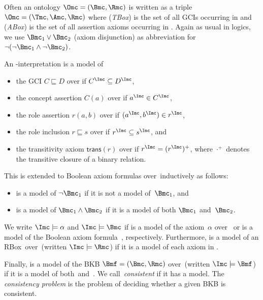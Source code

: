 Often an ontology $\Omc = (\Bmc, \Rmc)$ is written as a triple $\Omc = (\Tmc, \Amc, \Rmc)$ where
\Tmc (\emph{TBox}) is the set of all GCIs occurring in \Bmc and \Amc (\emph{ABox}) is the set of all
assertion axioms occurring in \Bmc.  Again as usual in logics, we use $\Bmc_1\lor\Bmc_2$ (axiom
disjunction) as abbreviation for $\lnot(\lnot\Bmc_1\land\lnot\Bmc_2)$.

\begin{definition}
  \label{def:semantics-of-axioms}
  An \Nsig-interpretation \I is a model of
  \begin{itemize}
  \item the GCI $C \sqsubseteq D$ over \Nsig if $C^{\I} \subseteq D^{\I}$,
  \item the concept assertion $C(a)$ over \Nsig if $a^{\I} \in C^{\I}$,
  \item the role assertion $r(a,b)$ over \Nsig if $(a^\I,b^\I)\in r^\I$,
  \item the role inclusion $r \sqsubseteq s$ over \Nsig if $r^\I \subseteq s^\I$, and
  \item the transitivity axiom $\mathsf{trans}(r)$ over \Nsig if $r^\I=(r^\I)^+$, where $\cdot^{+}$
    denotes the transitive closure of a binary relation.
  \end{itemize}

  This is extended to Boolean axiom formulas over~\Nsig inductively as follows:
  \begin{itemize}
  \item \I is a model of $\lnot\B_1$ if it is not a model of~$\B_1$, and
  \item \I is a model of $\B_1\land\B_2$ if it is a model of both $\B_1$ and~$\B_2$.
  \end{itemize}

  We write $\I\models\alpha$ and $\I\models\Bmc$ if \I is a model of the axiom~$\alpha$ over~\Nsig
  or \I is a model of the Boolean axiom formula~\B, respectively. Furthermore, \I is a model of an
  RBox~\Rmc over~\Nsig (written $\I\models\Rmc$) if it is a model of each axiom in \Rmc.

  Finally, \I is a model of the BKB $\Bmf=(\B,\Rmc)$ over~\Nsig (written $\I\models\Bmf$) if it is a
  model of both~\B and~\Rmc.  We call~\Bmf \emph{consistent} if it has a model.  The
  \emph{consistency problem} is the problem of deciding whether a given BKB is consistent.
\end{definition}


